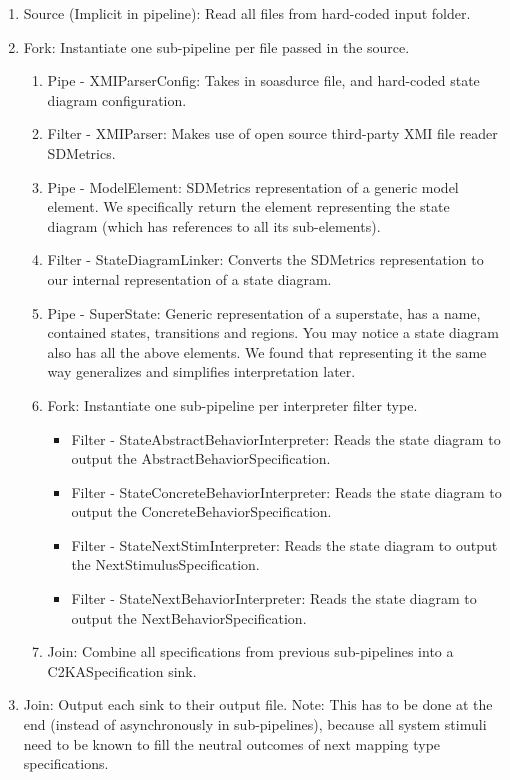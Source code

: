 \documentclass[11pt]{article}
\begin{document}
    \begin{enumerate}
        \item Source (Implicit in pipeline): Read all files from hard-coded input folder.
        \item Fork: Instantiate one sub-pipeline per file passed in the source.
        \begin{enumerate}
            \item Pipe - XMIParserConfig: Takes in soasdurce file, and hard-coded state diagram configuration.
            \item Filter - XMIParser: Makes use of open source third-party XMI file reader SDMetrics.
            \item Pipe - ModelElement: SDMetrics representation of a generic model element.
            We specifically return the element representing the state diagram (which has references to all its sub-elements).
            \item Filter - StateDiagramLinker: Converts the SDMetrics representation to our internal representation of a state diagram.
            \item Pipe - SuperState: Generic representation of a superstate, has a name, contained states, transitions and regions.
            You may notice a state diagram also has all the above elements.
            We found that representing it the same way generalizes and simplifies interpretation later.
            \item Fork: Instantiate one sub-pipeline per interpreter filter type.
            \begin{itemize}
                \item Filter - StateAbstractBehaviorInterpreter: Reads the state diagram to output the AbstractBehaviorSpecification.
                \item Filter - StateConcreteBehaviorInterpreter: Reads the state diagram to output the ConcreteBehaviorSpecification.
                \item Filter - StateNextStimInterpreter: Reads the state diagram to output the NextStimulusSpecification.
                \item Filter - StateNextBehaviorInterpreter: Reads the state diagram to output the NextBehaviorSpecification.
            \end{itemize}
            \item Join: Combine all specifications from previous sub-pipelines into a C2KASpecification sink.
        \end{enumerate}
        \item Join: Output each sink to their output file.
        Note: This has to be done at the end (instead of asynchronously in sub-pipelines),
        because all system stimuli need to be known to fill the neutral outcomes of next mapping type specifications.
    \end{enumerate}
\end{document}
